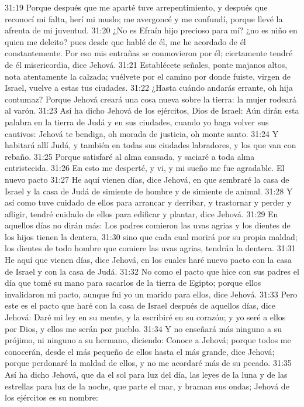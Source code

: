 31:19 Porque después que me aparté tuve arrepentimiento, y después que reconocí mi falta, herí mi muslo; me avergoncé y me confundí, porque llevé la afrenta de mi juventud. 
31:20 ¿No es Efraín hijo precioso para mí? ¿no es niño en quien me deleito? pues desde que hablé de él, me he acordado de él constantemente. Por eso mis entrañas se conmovieron por él; ciertamente tendré de él misericordia, dice Jehová. 
31:21 Establécete señales, ponte majanos altos, nota atentamente la calzada; vuélvete por el camino por donde fuiste, virgen de Israel, vuelve a estas tus ciudades. 
31:22 ¿Hasta cuándo andarás errante, oh hija contumaz? Porque Jehová creará una cosa nueva sobre la tierra: la mujer rodeará al varón. 
31:23 Así ha dicho Jehová de los ejércitos, Dios de Israel: Aún dirán esta palabra en la tierra de Judá y en sus ciudades, cuando yo haga volver sus cautivos: Jehová te bendiga, oh morada de justicia, oh monte santo. 
31:24 Y habitará allí Judá, y también en todas sus ciudades labradores, y los que van con rebaño. 
31:25 Porque satisfaré al alma cansada, y saciaré a toda alma entristecida. 
31:26 En esto me desperté, y vi, y mi sueño me fue agradable. 
El nuevo pacto 
31:27 He aquí vienen días, dice Jehová, en que sembraré la casa de Israel y la casa de Judá de simiente de hombre y de simiente de animal. 
31:28 Y así como tuve cuidado de ellos para arrancar y derribar, y trastornar y perder y afligir, tendré cuidado de ellos para edificar y plantar, dice Jehová. 
31:29 En aquellos días no dirán más: Los padres comieron las uvas agrias y los dientes de los hijos tienen la dentera, 
31:30 sino que cada cual morirá por su propia maldad; los dientes de todo hombre que comiere las uvas agrias, tendrán la dentera. 
31:31 He aquí que vienen días, dice Jehová, en los cuales haré nuevo pacto con la casa de Israel y con la casa de Judá. 
31:32 No como el pacto que hice con sus padres el día que tomé su mano para sacarlos de la tierra de Egipto; porque ellos invalidaron mi pacto, aunque fui yo un marido para ellos, dice Jehová. 
31:33 Pero este es el pacto que haré con la casa de Israel después de aquellos días, dice Jehová: Daré mi ley en su mente, y la escribiré en su corazón; y yo seré a ellos por Dios, y ellos me serán por pueblo. 
31:34 Y no enseñará más ninguno a su prójimo, ni ninguno a su hermano, diciendo: Conoce a Jehová; porque todos me conocerán, desde el más pequeño de ellos hasta el más grande, dice Jehová; porque perdonaré la maldad de ellos, y no me acordaré más de su pecado. 
31:35 Así ha dicho Jehová, que da el sol para luz del día, las leyes de la luna y de las estrellas para luz de la noche, que parte el mar, y braman sus ondas; Jehová de los ejércitos es su nombre: 
